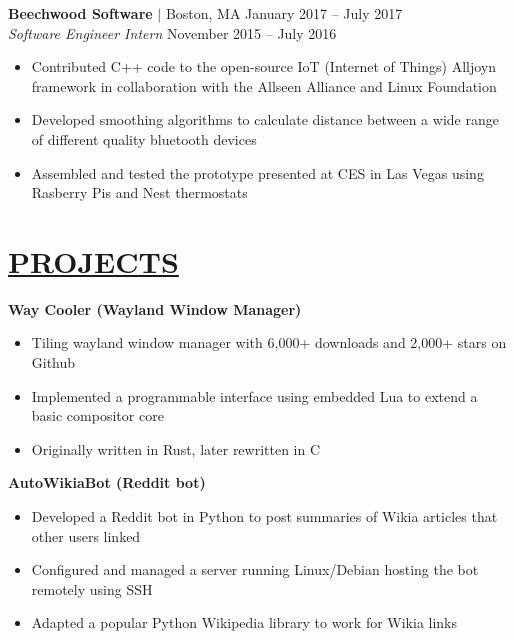 \documentclass[overlapped,line]{res}
\begin{document}
\begin{resume}
\textbf{Beechwood Software} $|$ Boston, MA \hfill January 2017 \--- July 2017\\
{\sl Software Engineer Intern} \hfill November 2015 \--- July 2016
\begin{itemize}  \itemsep -2pt
	\item Contributed C++ code to the open-source IoT (Internet of Things) Alljoyn framework in collaboration with the Allseen Alliance and Linux Foundation
	\item Developed smoothing algorithms to calculate distance between a wide range of different quality bluetooth devices
	\item Assembled and tested the prototype presented at CES in Las Vegas using Rasberry Pis and Nest thermostats
\end{itemize}
\noindent\makebox[7.15in]{\rule{7.15in}{0.4pt}}


\section{\underline{PROJECTS}}
\textbf{Way Cooler (Wayland Window Manager)}
\begin{itemize}  \itemsep -2pt
	\item Tiling wayland window manager with 6,000+ downloads and 2,000+ stars on Github
	\item Implemented a programmable interface using embedded Lua to extend
      a basic compositor core
    \item Originally written in Rust, later rewritten in C
\end{itemize}


\textbf{AutoWikiaBot (Reddit bot)} \hfill
\begin{itemize}  \itemsep -2pt
       \item Developed a Reddit bot in Python to post summaries of Wikia articles that other users linked
       \item Configured and managed a server running Linux/Debian hosting the bot remotely using SSH
       \item Adapted a popular Python Wikipedia library to work for Wikia links
\end{itemize}

\end{resume}
\end{document}
